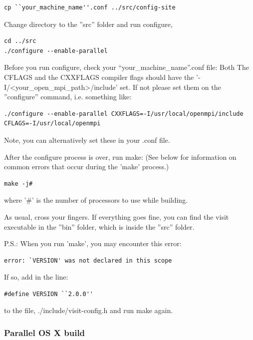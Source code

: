 \documentclass[12pt]{article}
\begin{document}
\begin{verbatim}
cp ``your_machine_name''.conf ../src/config-site
\end{verbatim}

Change directory to the ''src'' folder and run configure,

\begin{verbatim}
cd ../src
./configure --enable-parallel
\end{verbatim}

Before you run configure, check your ``your\_machine\_name''.conf
file: Both The CFLAGS and the CXXFLAGS compiler flags should have the
'-I/<your\_open\_mpi\_path>/include' set. If not please set them on the
''configure'' command, i.e. something like:

\begin{verbatim}
./configure --enable-parallel CXXFLAGS=-I/usr/local/openmpi/include CFLAGS=-I/usr/local/openmpi
\end{verbatim}

Note, you can alternatively set these in your .conf file.

After the configure process is over, run make:  (See below for
information on common errors that occur during the 'make' process.)

\begin{verbatim}
make -j#
\end{verbatim}

where '\#' is the number of processors to use while building.

As usual, cross your fingers. If everything goes fine, you can find
the visit executable in the ''bin'' folder, which is inside the
''src'' folder.

P.S.: When you run 'make', you may encounter this error:

\begin{verbatim}
error: `VERSION' was not declared in this scope
\end{verbatim}

If so, add in the line:

\begin{verbatim}
#define VERSION ``2.0.0''
\end{verbatim}

to the file, ./include/visit-config.h and run make again.

\subsubsection{Parallel OS X build}
\label{sec:ParallelOSXBuild}
\end{document}
